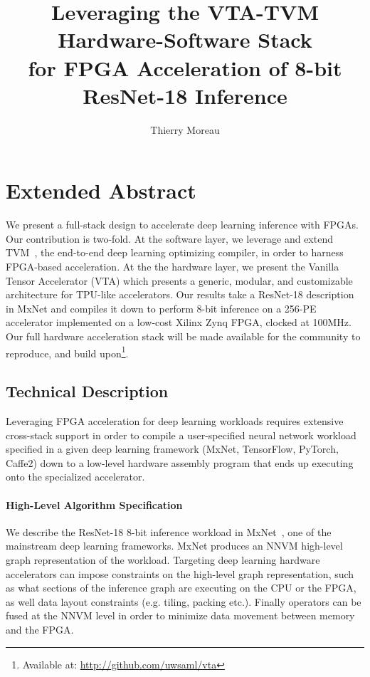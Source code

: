\documentclass[sigconf]{acmart}
\begin{document}

\title{Leveraging the VTA-TVM Hardware-Software Stack \\for FPGA Acceleration of 8-bit ResNet-18 Inference}

\author{Thierry Moreau}

\renewcommand{\shortauthors}{}
\renewcommand{\shorttitle}{}

\maketitle


\section{Extended Abstract}

We present a full-stack design to accelerate deep learning inference with FPGAs. Our contribution is two-fold. At the software layer, we leverage and extend TVM~\cite{chen:TVM}, the end-to-end deep learning optimizing compiler, in order to harness FPGA-based acceleration. At the the hardware layer, we present the Vanilla Tensor Accelerator (VTA) which presents a generic, modular, and customizable architecture for TPU-like accelerators.
Our results take a ResNet-18 description in MxNet and compiles it down to perform 8-bit inference on a 256-PE accelerator implemented on a low-cost Xilinx Zynq FPGA, clocked at 100MHz.
Our full hardware acceleration stack will be made available for the community to reproduce, and build upon\footnote{Available at: \url{http://github.com/uwsaml/vta}}.

\subsection{Technical Description}

Leveraging FPGA acceleration for deep learning workloads requires extensive cross-stack support in order to compile a user-specified neural network workload specified in a given deep learning framework (MxNet, TensorFlow, PyTorch, Caffe2) down to a low-level hardware assembly program that ends up executing onto the specialized accelerator.

\paragraph{High-Level Algorithm Specification}
We describe the ResNet-18 8-bit inference workload in MxNet~\cite{MXNet-whitepaper}, one of the mainstream deep learning frameworks.
MxNet produces an NNVM high-level graph representation of the workload.
Targeting deep learning hardware accelerators can impose constraints on the high-level graph representation, such as what sections of the inference graph are executing on the CPU or the FPGA, as well data layout constraints (e.g. tiling, packing etc.).
Finally operators can be fused at the NNVM level in order to minimize data movement between memory and the FPGA.
\end{document}
